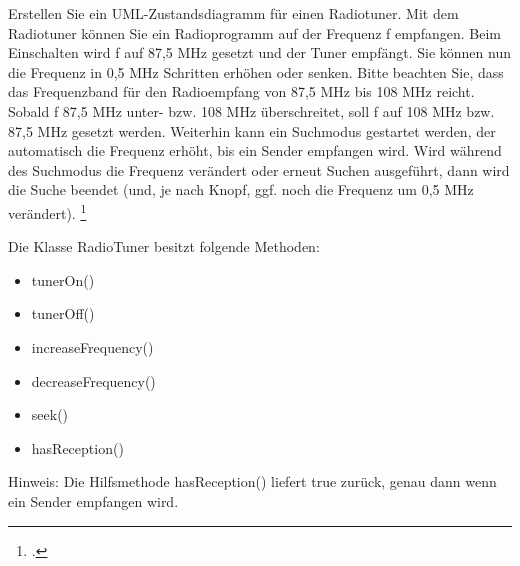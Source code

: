 \documentclass{bschlangaul-aufgabe}
\begin{document}

Erstellen Sie ein UML-Zustandsdiagramm für einen Radiotuner. Mit dem
Radiotuner können Sie ein Radioprogramm auf der Frequenz f empfangen.
Beim Einschalten wird f auf 87,5 MHz gesetzt und der Tuner empfängt. Sie
können nun die Frequenz in 0,5 MHz Schritten erhöhen oder senken. Bitte
beachten Sie, dass das Frequenzband für den Radioempfang von 87,5
MHz bis 108 MHz reicht. Sobald f 87,5 MHz unter- bzw. 108 MHz
überschreitet, soll f auf 108 MHz bzw. 87,5 MHz gesetzt werden. Weiterhin
kann ein Suchmodus gestartet werden, der automatisch die Frequenz
erhöht, bis ein Sender empfangen wird. Wird während des Suchmodus die
Frequenz verändert oder erneut Suchen ausgeführt, dann wird die Suche
beendet (und, je nach Knopf, ggf. noch die Frequenz um 0,5 MHz
verändert).
\footcite{examen:66116:2015:03}

\noindent
Die Klasse RadioTuner besitzt folgende Methoden:

\begin{itemize}
\item tunerOn()
\item tunerOff()
\item increaseFrequency()
\item decreaseFrequency()
\item seek()
\item hasReception()
\end{itemize}

\noindent
Hinweis: Die Hilfsmethode hasReception() liefert true zurück, genau dann
wenn ein Sender empfangen wird.

\end{document}
